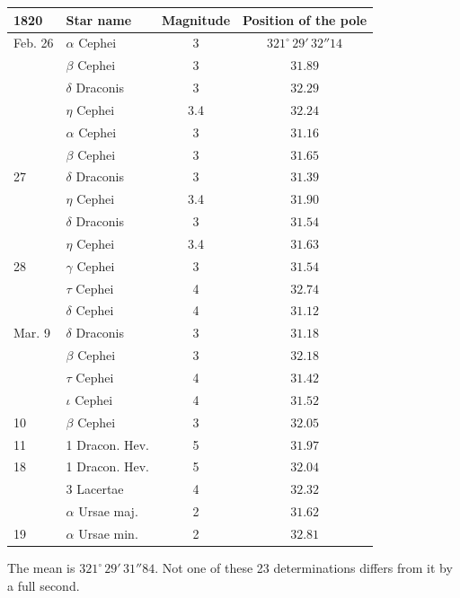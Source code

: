 \begin{center}
\begin{tabular}{l|l|c|c}
1820 & Star name & Magnitude & Position of the pole \\
\hline
Feb. 26 & $\alpha$ Cephei & 3 & $321^\circ\,29'\,32''14$ \\
 & $\beta$ Cephei & 3 & $31.89$ \\
 & $\delta$ Draconis & 3 & $32.29$ \\
 & $\eta$ Cephei & 3.4 & $32.24$ \\
 & $\alpha$ Cephei & 3 & $31.16$ \\
 & $\beta$ Cephei & 3 & $31.65$ \\
27 & $\delta$ Draconis & 3 & $31.39$ \\
 & $\eta$ Cephei & 3.4 & $31.90$ \\
 & $\delta$ Draconis & 3 & $31.54$ \\
 & $\eta$ Cephei & 3.4 & $31.63$ \\
28 & $\gamma$ Cephei & 3 & $31.54$ \\
 & $\tau$ Cephei & 4 & $32.74$ \\
 & $\delta$ Cephei & 4 & $31.12$ \\
Mar. 9 & $\delta$ Draconis & 3 & $31.18$ \\
 & $\beta$ Cephei & 3 & $32.18$ \\
 & $\tau$ Cephei & 4 & $31.42$ \\
 & $\iota$ Cephei & 4 & $31.52$ \\
10 & $\beta$ Cephei & 3 & $32.05$ \\
11 & 1 Dracon. Hev. & 5 & $31.97$ \\
18 & 1 Dracon. Hev. & 5 & $32.04$ \\
 & 3 Lacertae & 4 & $32.32$ \\
 & $\alpha$ Ursae maj. & 2 & $31.62$ \\
19 & $\alpha$ Ursae min. & 2 & $32.81$ \\
\end{tabular}
\end{center}

\par\indent The mean is $321^\circ\,29'\,31''84$. Not one of these 23 determinations differs from it by a full second.

